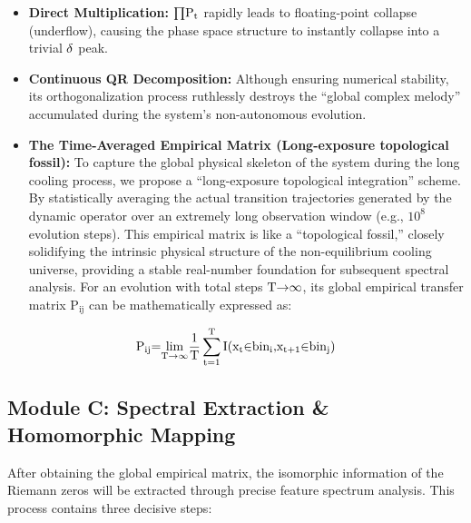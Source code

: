 \documentclass[fleqn,10pt]{wlscirep}
\begin{document}
\begin{itemize}
\item
  \textbf{Direct Multiplication:} \(\text{\ensuremath{\prod}}\text{P}_{\text{t}}\)
  rapidly leads to floating-point collapse (underflow), causing the
  phase space structure to instantly collapse into a trivial
  \(\text{\ensuremath{\delta}}\) peak.
\item
  \textbf{Continuous QR Decomposition:} Although ensuring numerical
  stability, its orthogonalization process ruthlessly destroys the
  ``global complex melody'' accumulated during the system's
  non-autonomous evolution.
\item
  \textbf{The Time-Averaged Empirical Matrix (Long-exposure topological
  fossil):} To capture the global physical skeleton of the system during
  the long cooling process, we propose a ``long-exposure topological
  integration'' scheme. By statistically averaging the actual transition
  trajectories generated by the dynamic operator over an extremely long
  observation window (e.g., \(\text{10}^{\text{8}}\) evolution steps).
  This empirical matrix is like a ``topological fossil,'' closely
  solidifying the intrinsic physical structure of the non-equilibrium
  cooling universe, providing a stable real-number foundation for
  subsequent spectral analysis. For an evolution with total steps
  \(\text{T}\text{\ensuremath{\rightarrow}\ensuremath{\infty}}\), its global empirical transfer matrix
  \(\text{P}_{\text{ij}}\) can be mathematically expressed as:
\end{itemize}

\[\text{P}_{\text{ij}}\text{=}\underset{\text{T}\text{\ensuremath{\rightarrow}\ensuremath{\infty}}}{\text{lim}}\frac{\text{1}}{\text{T}}\sum_{\text{t}\text{=1}}^{\text{T}}\text{I}\text{(}\text{x}_{\text{t}}\text{\ensuremath{\in}}\text{bin}_{\text{i}}\text{,}\text{x}_{\text{t}\text{+1}}\text{\ensuremath{\in}}\text{bin}_{\text{j}}\text{)}\]

\subsection*{Module C: Spectral Extraction \& Homomorphic Mapping}

After obtaining the global empirical matrix, the isomorphic information
of the Riemann zeros will be extracted through precise feature spectrum
analysis. This process contains three decisive steps:
\end{document}
